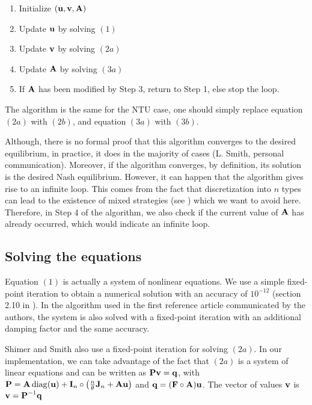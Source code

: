 \begin{enumerate}[start=0]
	\item Initialize $(\boldsymbol{\mathbf{u}},\boldsymbol{\mathbf{v}},\boldsymbol{\mathbf{A}})$
	\item Update $\boldsymbol{\mathbf{u}}$ by solving $(1)$
	\item Update $\boldsymbol{\mathbf{v}}$ by solving $(2a)$
	\item Update $\boldsymbol{\mathbf{A}}$ by solving $(3a)$
	\item If $\boldsymbol{\mathbf{A}}$ has been modified by Step 3, return to Step 1, else stop the loop.
\end{enumerate}

The algorithm is the same for the NTU case, one should simply replace equation $(2a)$ with $(2b)$, and equation $(3a)$ with $(3b)$.

Although, there is no formal proof that this algorithm converges to the desired equilibrium, in practice, it does in the majority of cases (L. Smith, personal communication). Moreover, if the algorithm converges, by definition, its solution is the desired Nash equilibrium. However, it can happen that the algorithm gives rise to an infinite loop. This comes from the fact that discretization into $n$ types can lead to the existence of mixed strategies (see \citep{hagedorn_identifying_2017}) which we want to avoid here. Therefore, in Step 4 of the algorithm, we also check if the current value of $\boldsymbol{\mathbf{A}}$ has already occurred, which would indicate an infinite loop. 


\subsection*{Solving the equations}

Equation $(1)$ is actually a system of nonlinear equations. We use a simple fixed-point iteration to obtain a numerical solution with an accuracy of $10^{-12}$ (section 2.10 in \citep{atkinson_introduction_1989}). In the algorithm used in the first reference article \citep{shimer_assortative_2000} communicated by the authors, the system is also solved with a fixed-point iteration with an additional damping factor and the same accuracy.

Shimer and Smith \citep{shimer_assortative_2000} also use a fixed-point iteration for solving $(2a)$. In our implementation, we can take advantage of the fact that $(2a)$ is a system of linear equations and can be written as $\boldsymbol{\mathbf{P}} \boldsymbol{\mathbf{v}} = \boldsymbol{\mathbf{q}}$, with $\boldsymbol{\mathbf{P}} = \boldsymbol{\mathbf{A}} \operatorname{diag}(\boldsymbol{\mathbf{u}}) + \boldsymbol{\mathbf{I}}_n \circ \left(\frac{n}{\theta} \boldsymbol{\mathbf{J}}_n + \boldsymbol{\mathbf{A}} \boldsymbol{\mathbf{u}}\right)$ and $\boldsymbol{\mathbf{q}} = (\boldsymbol{\mathbf{F}} \circ \boldsymbol{\mathbf{A}}) \boldsymbol{\mathbf{u}}$. The vector of values $\boldsymbol{\mathbf{v}}$ is $ \boldsymbol{\mathbf{v}} = \boldsymbol{\mathbf{P}}^{-1} \boldsymbol{\mathbf{q}} $

